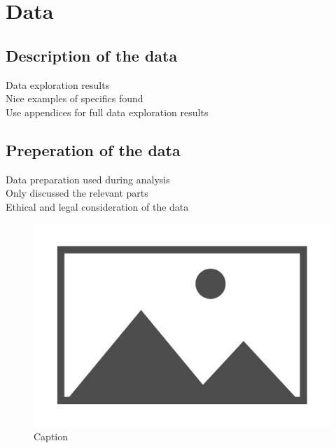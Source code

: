 

\chapter{Data}
\label{chap:data}
\pagestyle{fancy}

\section{Description of the data}
Data exploration results \\ 
Nice examples of specifics found \\
Use appendices for full data exploration results \\ 

\section{Preperation of the data}
Data preparation used during analysis \\ 
Only discussed the relevant parts\\ 
Ethical and legal consideration of the data \\


\begin{figure}
    \centering
    \includegraphics{IMAGES/image_placeholder.jpg}
    \caption{Caption}
    \label{fig:my_label}
\end{figure}

\lipsum[3-4]